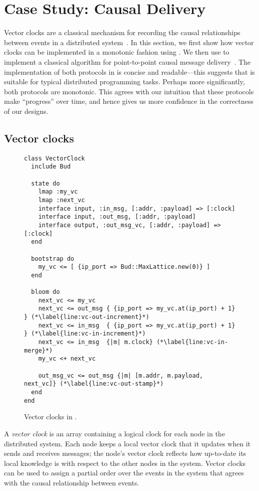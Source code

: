 \section{Case Study: Causal Delivery}
\label{sec:causal}

Vector clocks are a classical mechanism for recording the causal relationships
between events in a distributed system~\cite{Fidge1988,Mattern1989}. In this
section, we first show how vector clocks can be implemented in a monotonic
fashion using \lang. We then use \lang to implement a classical algorithm for
point-to-point causal message delivery~\cite{Schiper1989}. The implementation of
both protocols in \lang is concise and readable---this suggests that \lang is
suitable for typical distributed programming tasks. Perhaps more significantly,
both protocols are monotonic. This agrees with our intuition that these
protocols make ``progress'' over time, and hence gives us more confidence in the
correctness of our designs.

\subsection{Vector clocks}
\begin{figure}[t]
\begin{scriptsize}
\begin{lstlisting}
class VectorClock
  include Bud

  state do
    lmap :my_vc
    lmap :next_vc
    interface input, :in_msg, [:addr, :payload] => [:clock]
    interface input, :out_msg, [:addr, :payload]
    interface output, :out_msg_vc, [:addr, :payload] => [:clock]
  end

  bootstrap do
    my_vc <= [ {ip_port => Bud::MaxLattice.new(0)} ]
  end

  bloom do
    next_vc <= my_vc
    next_vc <= out_msg { {ip_port => my_vc.at(ip_port) + 1} } (*\label{line:vc-out-increment}*)
    next_vc <= in_msg  { {ip_port => my_vc.at(ip_port) + 1} } (*\label{line:vc-in-increment}*)
    next_vc <= in_msg  {|m| m.clock} (*\label{line:vc-in-merge}*)
    my_vc <+ next_vc

    out_msg_vc <= out_msg {|m| [m.addr, m.payload, next_vc]} (*\label{line:vc-out-stamp}*)
  end
end
\end{lstlisting}
\end{scriptsize}
\caption{Vector clocks in \lang.}
\label{fig:vector-clock-src}
\end{figure}

A \emph{vector clock} is an array containing a logical clock for each node in
the distributed system. Each node keeps a local vector clock that it updates
when it sends and receives messages; the node's vector clock reflects how
up-to-date its local knowledge is with respect to the other nodes in the
system. Vector clocks can be used to assign a partial order over the events in
the system that agrees with the causal relationship between events.

